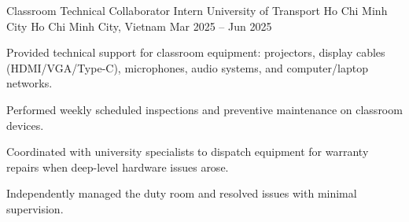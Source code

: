 \begin{cventries} %
  \cventry
    {Classroom Technical Collaborator Intern} %
    {University of Transport Ho Chi Minh City} %
    {Ho Chi Minh City, Vietnam} %
    {Mar 2025 -- Jun 2025} %
    {
      \begin{cvitems} %
        \item {Provided technical support for classroom equipment: projectors, display cables (HDMI/VGA/Type-C), microphones, audio systems, and computer/laptop networks.}
        \item {Performed weekly scheduled inspections and preventive maintenance on classroom devices.}
        \item {Coordinated with university specialists to dispatch equipment for warranty repairs when deep-level hardware issues arose.}
        \item {Independently managed the duty room and resolved issues with minimal supervision.}
      \end{cvitems}
    }

\end{cventries}
